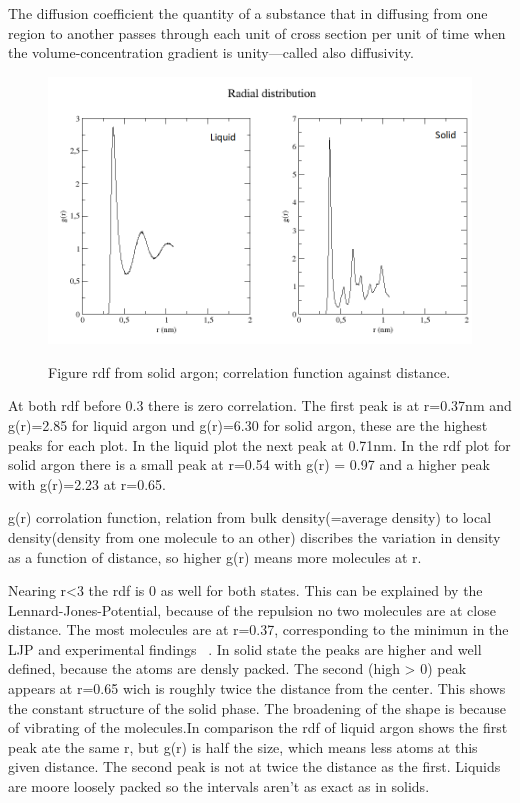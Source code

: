 \documentclass[10pt, a4paper, oneside, twocolumn]{report}
\begin{document}
The diffusion coefficient the quantity of a substance that in diffusing from one region to another passes through each unit of cross section per unit of time when the volume-concentration gradient is unity—called also diffusivity.       

\begin{figure}
	\centering
		\includegraphics[width=\linewidth]{plots/rdf.png}
		\label{fig:1a}
\caption{Figure rdf from solid argon; correlation function against distance.}
\end{figure}

At both rdf before 0.3 there is zero correlation. The first peak is at r=0.37nm and g(r)=2.85 for liquid argon und g(r)=6.30 for solid argon, these are the highest peaks for each plot. In the liquid plot the next peak at 0.71nm. In the rdf plot for solid argon there is a small peak at r=0.54 with g(r) = 0.97 and a higher peak with g(r)=2.23 at r=0.65.

g(r) corrolation function, relation from bulk density(=average density) to local density(density from one molecule to an other) discribes the variation in density as a function of distance, so higher g(r) means more molecules at r.

Nearing r<3 the rdf is 0 as well for both states. This can be explained by the Lennard-Jones-Potential, because of the repulsion no two molecules are at close distance. The most molecules are at r=0.37, corresponding to the minimun in the LJP and experimental findings ~\cite{Argon, RDF}.
In solid state the peaks are higher and well defined, because the atoms are densly packed. The second (high > 0) peak appears at r=0.65 wich is roughly twice the distance from the center. This shows the constant structure of the solid phase. The broadening of the shape is because of vibrating of the molecules.In comparison the rdf of liquid argon shows the first peak ate the same r, but g(r) is half the size, which means less atoms at this given distance. The second peak is not at twice the distance as the first. Liquids are moore loosely packed so the intervals aren't as exact as in solids.
\end{document}

